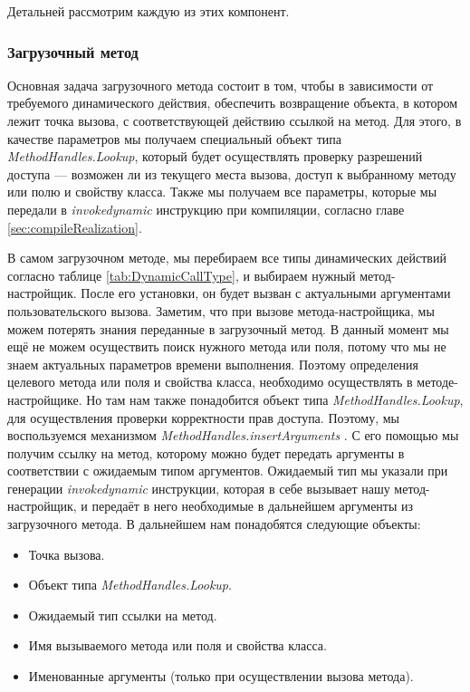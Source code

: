 Детальней рассмотрим каждую из этих компонент.

\subsubsection{Загрузочный метод}

Основная задача загрузочного метода состоит в том, чтобы в зависимости от требуемого динамического действия, обеспечить возвращение объекта, в котором лежит точка вызова, с соответствующей действию ссылкой на метод. Для этого, в качестве параметров мы получаем специальный объект типа \textit{MethodHandles.Lookup}, который будет осуществлять проверку разрешений доступа --- возможен ли из текущего места вызова, доступ к выбранному методу или полю и свойству класса. Также мы получаем все параметры, которые мы передали в \textit{invokedynamic} инструкцию при компиляции, согласно главе \ref{sec:compileRealization}.

В самом загрузочном методе, мы перебираем все типы динамических  действий согласно таблице \ref{tab:DynamicCallType}, и выбираем нужный метод-настройщик. После его установки, он будет вызван с актуальными аргументами пользовательского вызова. Заметим, что при вызове метода-настройщика, мы можем потерять знания переданные в загрузочный метод. В данный момент мы ещё не можем осуществить поиск нужного метода или поля, потому что мы не знаем актуальных параметров времени выполнения. Поэтому определения целевого метода или поля и свойства класса, необходимо осуществлять в методе-настройщике. Но там нам также понадобится объект типа \textit{MethodHandles.Lookup}, для осуществления проверки корректности прав доступа. Поэтому, мы воспользуемся механизмом  \textit{MethodHandles.insertArguments} \cite{javadoc:MethodHandlesLookup}. С его помощью мы получим ссылку на метод, которому можно будет передать аргументы в соответствии с ожидаемым типом аргументов. Ожидаемый тип мы указали при генерации \textit{invokedynamic} инструкции, которая в себе вызывает нашу метод-настройщик, и передаёт в него необходимые в дальнейшем аргументы из загрузочного метода. В дальнейшем нам понадобятся следующие объекты:
\begin{itemize}
    \item Точка вызова.
    \item Объект типа \textit{MethodHandles.Lookup}.
    \item Ожидаемый тип ссылки на метод.
    \item Имя вызываемого метода или поля и свойства класса.
    \item Именованные аргументы (только при осуществлении вызова метода).
\end{itemize}



